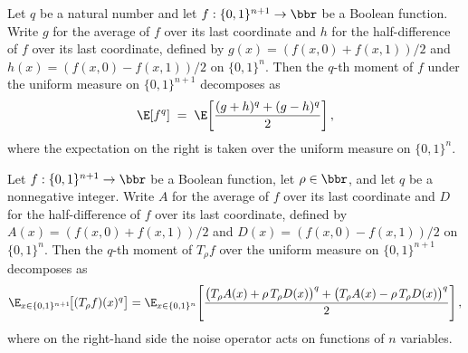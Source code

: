 \begin{lemma}
\label{BooleanAnalysis.Hypercontractivity.qth_moment_decomp}
\leanok
{}
Let $q$ be a natural number and let $f:\{0,1\}^{n+1}\to\bbr$ be a Boolean function.
Write $g$ for the average of $f$ over its last coordinate and $h$ for the
half-difference of $f$ over its last coordinate, defined by
$g(x)=(f(x,0)+f(x,1))/2$ and $h(x)=(f(x,0)-f(x,1))/2$
on $\{0,1\}^n$.
Then the $q$-th moment of $f$ under the uniform measure on $\{0,1\}^{n+1}$ decomposes as
\[
  \E[f^q] \;=\; \E\!\left[\frac{(g+h)^q + (g-h)^q}{2}\right],
\]
where the expectation on the right is taken over the uniform measure on $\{0,1\}^n$.
\end{lemma}

\begin{lemma}
\label{BooleanAnalysis.Hypercontractivity.noise_qth_moment_decomp}
\leanok
{}
Let $f:\{0,1\}^{n+1}\to\bbr$ be a Boolean function, let $\rho\in\bbr$, and let $q$ be a
nonnegative integer. Write $A$ for the average of $f$ over its last coordinate and $D$
for the half-difference of $f$ over its last coordinate, defined by
$A(x)=(f(x,0)+f(x,1))/2$ and $D(x)=(f(x,0)-f(x,1))/2$
on $\{0,1\}^n$.
Then the $q$-th moment of $T_\rho f$ over the uniform measure on $\{0,1\}^{n+1}$
decomposes as
\[
  \E_{x\in\{0,1\}^{n+1}}\!\bigl[(T_\rho f)(x)^q\bigr]
= \E_{x\in\{0,1\}^{n}}\!\left[\frac{\bigl(T_\rho A(x) + \rho\,T_\rho D(x)\bigr)^{q} +
\bigl(T_\rho A(x) - \rho\,T_\rho D(x)\bigr)^{q}}{2}\right],
\]
where on the right-hand side the noise operator acts on functions of $n$ variables.
\end{lemma}

